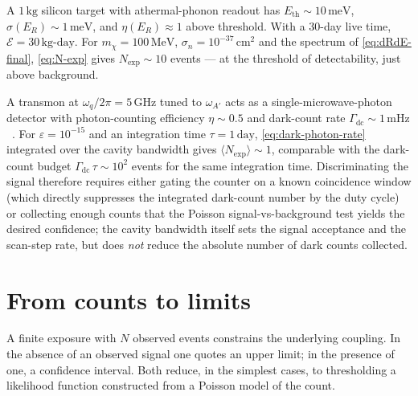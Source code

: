 \begin{example}
\label{ex:phonon-detector}
A $1\,\text{kg}$ silicon target with athermal-phonon readout has
$E_\text{th}\sim 10\,\text{meV}$, $\sigma(E_R)\sim 1\,\text{meV}$,
and $\eta(E_R)\approx 1$ above threshold. With a $30$-day live
time, $\mathcal E=30\,\text{kg-day}$. For
$m_\chi=100\,\text{MeV}$, $\sigma_n=10^{-37}\,\text{cm}^2$ and the
spectrum of \cref{eq:dRdE-final}, \cref{eq:N-exp} gives
$N_\text{exp}\sim 10$ events --- at the threshold of detectability,
just above background.
\end{example}

\begin{example}
\label{ex:transmon-counter}
A transmon at $\omega_q/2\pi=5\,\text{GHz}$ tuned to $\omega_{A'}$
acts as a single-microwave-photon detector with photon-counting
efficiency $\eta\sim 0.5$ and dark-count rate
$\Gamma_\text{dc}\sim 1\,\text{mHz}$~\cite{dixit2021}. For
$\varepsilon=10^{-15}$ and an integration time
$\tau=1\,\text{day}$, \cref{eq:dark-photon-rate} integrated over
the cavity bandwidth gives $\langle N_\text{exp}\rangle\sim 1$,
comparable with the dark-count budget
$\Gamma_\text{dc}\,\tau\sim 10^2$ events for the same integration
time. Discriminating the signal therefore requires either
gating the counter on a known coincidence window (which directly
suppresses the integrated dark-count number by the duty cycle) or
collecting enough counts that the Poisson signal-vs-background
test yields the desired confidence; the cavity bandwidth itself
sets the signal acceptance and the scan-step rate, but does
\emph{not} reduce the absolute number of dark counts collected.
\end{example}

\section{From counts to limits}
\label{sec:limits}

\begin{phenomenon}
A finite exposure with $N$ observed events constrains the
underlying coupling. In the absence of an observed signal one
quotes an upper limit; in the presence of one, a confidence
interval. Both reduce, in the simplest cases, to thresholding a
likelihood function constructed from a Poisson model of the count.
\end{phenomenon}

